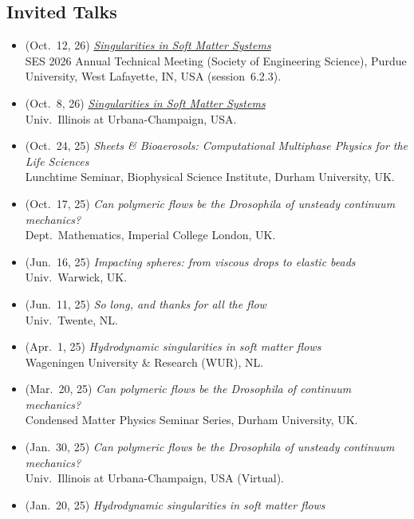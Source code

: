 \documentclass[10pt,a4paper,colorlinks,linkcolor=blue,urlcolor=blue,citecolor=blue]{moderncv}
\begin{document}
\subsection{\faMicrophone\hspace{0.3em}Invited Talks}
\begin{itemize}[leftmargin=1.5em]
\item[\textbullet] (Oct.~12, 26) \emph{\href{https://comphy-lab.org/talks/singular-bursting-bubbles/\#5a0b53ad}{Singularities in Soft Matter Systems}} \\
  SES 2026 Annual Technical Meeting (Society of Engineering Science), Purdue University, West Lafayette, IN, USA (session~6.2.3).
\item[\textbullet] (Oct.~8, 26) \emph{\href{https://comphy-lab.org/talks/singular-bursting-bubbles/\#5a0b53ad}{Singularities in Soft Matter Systems}} \\
  Univ.~Illinois at Urbana-Champaign, USA.
\item[\textbullet] (Oct.~24, 25) \emph{Sheets \& Bioaerosols: Computational Multiphase Physics for the Life Sciences} \\
  Lunchtime Seminar, Biophysical Science Institute, Durham University, UK.
\item[\textbullet] (Oct.~17, 25) \emph{Can polymeric flows be the Drosophila of unsteady continuum mechanics?} \\
  Dept.~Mathematics, Imperial College London, UK.
\item[\textbullet] (Jun.~16, 25) \emph{Impacting spheres: from viscous drops to elastic beads} \\
  Univ.~Warwick, UK.
\item[\textbullet] (Jun.~11, 25) \emph{So long, and thanks for all the flow} \\
  Univ.~Twente, NL.
\item[\textbullet] (Apr.~1, 25) \emph{Hydrodynamic singularities in soft matter flows} \\
  Wageningen University \& Research (WUR), NL.
\item[\textbullet] (Mar.~20, 25) \emph{Can polymeric flows be the Drosophila of continuum mechanics?} \\
  Condensed Matter Physics Seminar Series, Durham University, UK.
\item[\textbullet] (Jan.~30, 25) \emph{Can polymeric flows be the Drosophila of unsteady continuum mechanics?} \\
  Univ.~Illinois at Urbana-Champaign, USA (Virtual).
\item[\textbullet] (Jan.~20, 25) \emph{Hydrodynamic singularities in soft matter flows} \\

\end{itemize}
\end{document}
